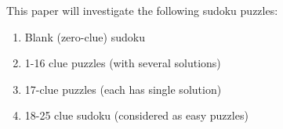 \documentclass[a4paper,oneside,11pt]{report}
\begin{document}
This paper will investigate the following sudoku puzzles:
\begin{enumerate}
\item Blank (zero-clue) sudoku
\item 1-16 clue puzzles (with several solutions)
\item 17-clue puzzles (each has single solution)
\item 18-25 clue sudoku (considered as easy puzzles)\\
\end{enumerate}
\newpage
\begin{figure}[h]
  \centering
  \hspace{2cm}
  \vspace{3cm}
  \hfill

\end{figure}
\end{document}
